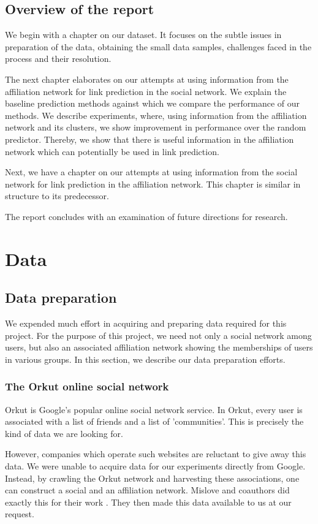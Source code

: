 \documentclass{report}
\begin{document}
\section{Overview of the report}
We begin with a chapter on our dataset. It focuses on the subtle issues in preparation of the data, obtaining the small data samples, challenges faced in the process and their resolution.

The next chapter elaborates on our attempts at using information from the affiliation network for link prediction in the social network. We explain the baseline prediction methods against which we compare the performance of our methods. We describe experiments, where, using information from the affiliation network and its clusters, we show improvement in performance over the random predictor. Thereby, we show that there is useful information in the affiliation network which can potentially be used in link prediction.

Next, we have a chapter on our attempts at using information from the social network for link prediction in the affiliation network. This chapter is similar in structure to its predecessor.

The report concludes with an examination of future directions for research.

\chapter{Data}
\section{Data preparation}
We expended much effort in acquiring and preparing data required for this project. For the purpose of this project, we need not only a social network among users, but also an associated affiliation network showing the memberships of users in various groups. In this section, we describe our data preparation efforts.

\subsection{The Orkut online social network}
Orkut is Google's popular online social network service. In Orkut, every user is associated with a list of friends and a list of 'communities'. This is precisely the kind of data we are looking for.

However, companies which operate such websites are reluctant to give away this data. We were unable to acquire data for our experiments directly from Google. Instead, by crawling the Orkut network and harvesting these associations, one can construct a social and an affiliation network. Mislove and coauthors did exactly this for their work \cite{mislove-2007-socialnetworks}. They then made this data available to us at our request.
\end{document}
